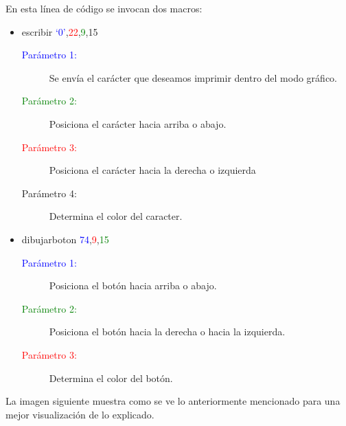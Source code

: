 \documentclass[letterpaper,12 pt,titlepage]{article}
\begin{document}
    En esta línea de código se invocan dos macros:
    \begin{itemize}
        \item escribir \textcolor{blue}{`0'},\textcolor{red}{22},\textcolor{green}{9},15 
        \begin{center}
            \begin{minipage}{0.85\linewidth}
                \begin{description}
                    \item[\textcolor{blue}{Parámetro 1:}] Se envía el carácter que deseamos imprimir dentro del modo gráfico.
                    \item[\textcolor{green}{Parámetro 2:}] Posiciona el carácter hacia arriba o abajo.
                    \item[\textcolor{red}{Parámetro 3:}] Posiciona el carácter hacia la derecha o izquierda
                    \item[Parámetro 4:] Determina el color del caracter.
                \end{description}
            \end{minipage}
        \end{center}

        \item dibujarboton  \textcolor{blue}{74},\textcolor{red}{9},\textcolor{green}{15}
        \begin{center}
            \begin{minipage}{0.85\linewidth}
                \begin{description}
                    \item[\textcolor{blue}{Parámetro 1:}] Posiciona el botón hacia arriba o abajo.
                    \item[\textcolor{green}{Parámetro 2:}] Posiciona el botón hacia la derecha o hacia la izquierda.
                    \item[\textcolor{red}{Parámetro 3:}] Determina el color del botón.
                \end{description}
            \end{minipage}
        \end{center}
    \end{itemize}

    La imagen siguiente muestra como se ve lo anteriormente mencionado para una mejor visualización de lo explicado.
\end{document}
